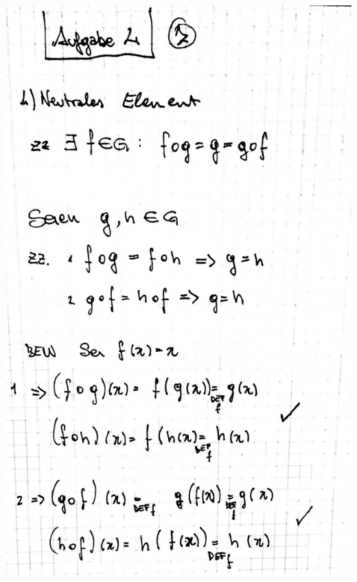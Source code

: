 \documentclass[10pt,a4paper]{article}
\begin{document}
\includegraphics[width=\textwidth]{lat5b_7.jpg}
\end{document}

